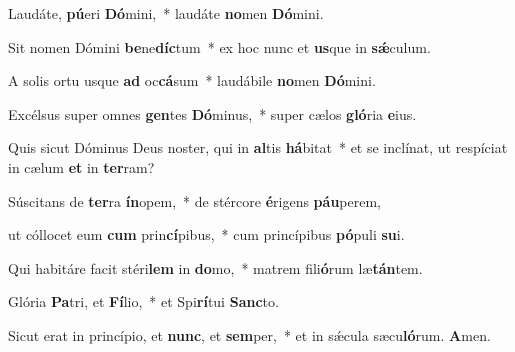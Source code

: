 \item Laudáte, \textbf{pú}eri \textbf{Dó}mini,~* laudáte \textbf{no}men \textbf{Dó}mini.

\item Sit nomen Dómini \textbf{be}ne\textbf{díc}tum~* ex hoc nunc et \textbf{us}que in \textbf{sǽ}culum.

\item A solis ortu usque \textbf{ad} oc\textbf{cá}sum~* laudábile \textbf{no}men \textbf{Dó}mini.

\item Excélsus super omnes \textbf{gen}tes \textbf{Dó}minus,~* super cælos \textbf{gló}ria \textbf{e}ius.

\item Quis sicut Dóminus Deus noster, qui in \textbf{al}tis \textbf{há}bitat~* et se inclínat, ut respíciat in cælum \textbf{et} in \textbf{ter}ram?

\item Súscitans de \textbf{ter}ra \textbf{ín}opem,~* de stércore \textbf{é}rigens \textbf{páu}perem,

\item ut cóllocet eum \textbf{cum} prin\textbf{cí}pibus,~* cum princípibus \textbf{pó}puli \textbf{su}i.

\item Qui habitáre facit stéri\textbf{lem} in \textbf{do}mo,~* matrem fili\textbf{ó}rum læ\textbf{tán}tem.

\item Glória \textbf{Pa}tri, et \textbf{Fí}lio,~* et Spi\textbf{rí}tui \textbf{Sanc}to.

\item Sicut erat in princípio, et \textbf{nunc}, et \textbf{sem}per,~* et in sǽcula sæcu\textbf{ló}rum. \textbf{A}men.